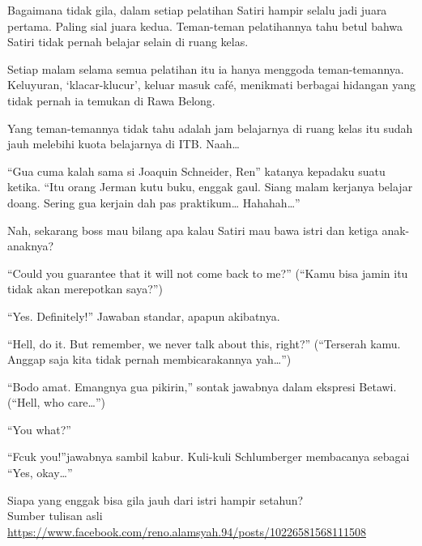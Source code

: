 Bagaimana tidak gila, dalam setiap pelatihan Satiri hampir selalu jadi juara pertama. Paling sial juara kedua. Teman-teman pelatihannya tahu betul bahwa Satiri tidak pernah belajar selain di ruang kelas.

Setiap malam selama semua pelatihan itu ia hanya menggoda teman-temannya. Keluyuran, ‘klacar-klucur’, keluar masuk café, menikmati berbagai hidangan yang tidak pernah ia temukan di Rawa Belong.

Yang teman-temannya tidak tahu adalah jam belajarnya di ruang kelas itu sudah jauh melebihi kuota belajarnya di ITB. Naah…

“Gua cuma kalah sama si Joaquin Schneider, Ren” katanya kepadaku suatu ketika. “Itu orang Jerman kutu buku, enggak gaul. Siang malam kerjanya belajar doang. Sering gua kerjain dah pas praktikum… Hahahah…”

Nah, sekarang boss mau bilang apa kalau Satiri mau bawa istri dan ketiga anak-anaknya?

“Could you guarantee that it will not come back to me?” (“Kamu bisa jamin itu tidak akan merepotkan saya?”)

“Yes. Definitely!” Jawaban standar, apapun akibatnya.

“Hell, do it. But remember, we never talk about this, right?” (“Terserah kamu. Anggap saja kita tidak pernah membicarakannya yah…”)

“Bodo amat. Emangnya gua pikirin,” sontak jawabnya dalam ekspresi Betawi. (“Hell, who care…”)

“You what?”

“Fcuk you!”jawabnya sambil kabur. Kuli-kuli Schlumberger membacanya sebagai “Yes, okay…”

Siapa yang enggak bisa gila jauh dari istri hampir setahun?
\\[10pt]

Sumber tulisan asli \url{https://www.facebook.com/reno.alamsyah.94/posts/10226581568111508}

